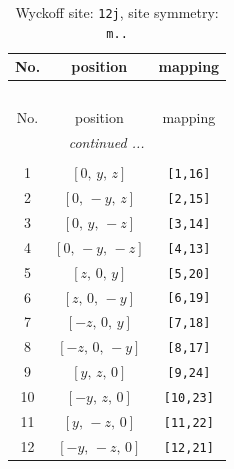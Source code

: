 \documentclass[fleqn,8pt]{jsarticle}
\begin{document}
\begin{longtable}{ccc}
\caption{Wyckoff site: {\tt 12j}, site symmetry: {\tt m..}}
 \\
 \hline \hline
No. & position & mapping \\ \hline \endfirsthead

\multicolumn{2}{l}{\tablename\ \thetable{}} \\
 \hline \hline
No. & position & mapping \\ \hline \endhead

 \hline \hline
\multicolumn{2}{r}{\footnotesize\it continued ...} \\ \endfoot

 \hline \hline
\multicolumn{2}{r}{} \\ \endlastfoot

1 & $\left[ 0,\, y,\, z \right]$ & {\tt [1,16]} \\ \hline
2 & $\left[ 0,\, - y,\, z \right]$ & {\tt [2,15]} \\ \hline
3 & $\left[ 0,\, y,\, - z \right]$ & {\tt [3,14]} \\ \hline
4 & $\left[ 0,\, - y,\, - z \right]$ & {\tt [4,13]} \\ \hline
5 & $\left[ z,\, 0,\, y \right]$ & {\tt [5,20]} \\ \hline
6 & $\left[ z,\, 0,\, - y \right]$ & {\tt [6,19]} \\ \hline
7 & $\left[ - z,\, 0,\, y \right]$ & {\tt [7,18]} \\ \hline
8 & $\left[ - z,\, 0,\, - y \right]$ & {\tt [8,17]} \\ \hline
9 & $\left[ y,\, z,\, 0 \right]$ & {\tt [9,24]} \\ \hline
10 & $\left[ - y,\, z,\, 0 \right]$ & {\tt [10,23]} \\ \hline
11 & $\left[ y,\, - z,\, 0 \right]$ & {\tt [11,22]} \\ \hline
12 & $\left[ - y,\, - z,\, 0 \right]$ & {\tt [12,21]} \\
\end{longtable}
\renewcommand{\arraystretch}{1.2}
\end{document}
